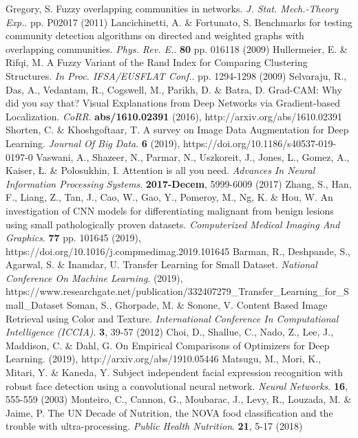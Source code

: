 \documentclass{article}
\begin{document}
\begin{thebibliography}{1}
	Gregory, S. Fuzzy overlapping communities in networks. {\em J. Stat. Mech.-Theory Exp.}. pp. P02017 (2011)
	Lancichinetti, A. \& Fortunato, S. Benchmarks for testing community detection algorithms on directed and weighted graphs with overlapping communities. {\em Phys. Rev. E.}. \textbf{80} pp. 016118 (2009)
	Hullermeier, E. \& Rifqi, M. A Fuzzy Variant of the Rand Index for Comparing Clustering Structures. {\em In Proc. IFSA/EUSFLAT Conf.}. pp. 1294-1298 (2009)
	Selvaraju, R., Das, A., Vedantam, R., Cogswell, M., Parikh, D. \& Batra, D. Grad-CAM: Why did you say that? Visual Explanations from Deep Networks via Gradient-based Localization. {\em CoRR}. \textbf{abs/1610.02391} (2016), http://arxiv.org/abs/1610.02391
	Shorten, C. \& Khoshgoftaar, T. A survey on Image Data Augmentation for Deep Learning. {\em Journal Of Big Data}. \textbf{6} (2019), https://doi.org/10.1186/s40537-019-0197-0
	Vaswani, A., Shazeer, N., Parmar, N., Uszkoreit, J., Jones, L., Gomez, A., Kaiser, Ł. \& Polosukhin, I. Attention is all you need. {\em Advances In Neural Information Processing Systems}. \textbf{2017-Decem}, 5999-6009 (2017)
	Zhang, S., Han, F., Liang, Z., Tan, J., Cao, W., Gao, Y., Pomeroy, M., Ng, K. \& Hou, W. An investigation of CNN models for differentiating malignant from benign lesions using small pathologically proven datasets. {\em Computerized Medical Imaging And Graphics}. \textbf{77} pp. 101645 (2019), https://doi.org/10.1016/j.compmedimag.2019.101645
	Barman, R., Deshpande, S., Agarwal, S. \& Inamdar, U. Transfer Learning for Small Dataset. {\em National Conference On Machine Learning}. (2019), https://www.researchgate.net/publication/332407279_Transfer_Learning_for_Small_Dataset
	Soman, S., Ghorpade, M. \& Sonone, V. Content Based Image Retrieval using Color and Texture. {\em International Conference In Computational Intelligence (ICCIA)}. \textbf{3}, 39-57 (2012)
	Choi, D., Shallue, C., Nado, Z., Lee, J., Maddison, C. \& Dahl, G. On Empirical Comparisons of Optimizers for Deep Learning.  (2019), http://arxiv.org/abs/1910.05446
	Matsugu, M., Mori, K., Mitari, Y. \& Kaneda, Y. Subject independent facial expression recognition with robust face detection using a convolutional neural network. {\em Neural Networks}. \textbf{16}, 555-559 (2003)
	Monteiro, C., Cannon, G., Moubarac, J., Levy, R., Louzada, M. \& Jaime, P. The UN Decade of Nutrition, the NOVA food classification and the trouble with ultra-processing. {\em Public Health Nutrition}. \textbf{21}, 5-17 (2018)

\end{thebibliography}
\end{document}

